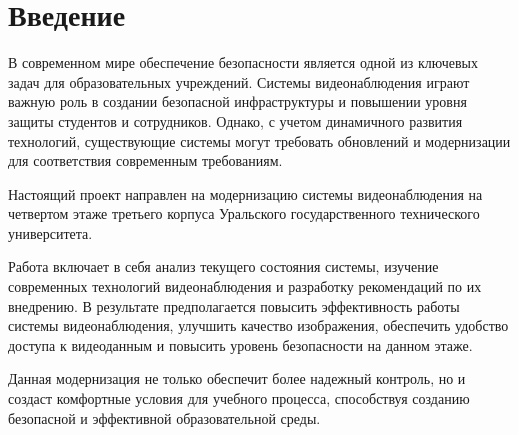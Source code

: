 \section*{Введение}

В современном мире обеспечение безопасности является одной из ключевых задач для образовательных учреждений.
Системы видеонаблюдения играют важную роль в создании безопасной инфраструктуры и
повышении уровня защиты студентов и сотрудников.
Однако, с учетом динамичного развития технологий, существующие системы могут требовать обновлений и
модернизации для соответствия современным требованиям.

Настоящий проект направлен на модернизацию системы видеонаблюдения на четвертом этаже
третьего корпуса Уральского государственного технического университета.

Работа включает в себя анализ текущего состояния системы, изучение современных технологий видеонаблюдения
и разработку рекомендаций по их внедрению.
В результате предполагается повысить эффективность работы системы видеонаблюдения, улучшить качество изображения,
обеспечить удобство доступа к видеоданным и повысить уровень безопасности на данном этаже.

Данная модернизация не только обеспечит более надежный контроль, но и создаст комфортные условия для учебного процесса,
способствуя созданию безопасной и эффективной образовательной среды.